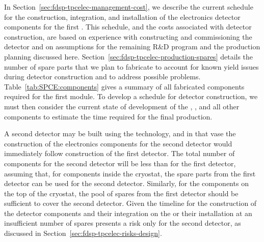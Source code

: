In Section~\ref{sec:fdsp-tpcelec-management-cost}, we describe
the current schedule for the construction, integration, and installation
of the  electronics detector components for the first  
. This schedule, and the costs associated
with detector construction, are based on experience with constructing
and commissioning the 
detector and on assumptions for the remaining R\&D program
and the production planning discussed here. 
Section~\ref{sec:fdsp-tpcelec-production-spares} details
the number of spare parts that we plan to fabricate to
account for known yield issues during detector construction
and to address possible problems. Table~\ref{tab:SPCE:components}
gives a summary of all fabricated components required for the first 
 module. To develop a schedule for detector construction, 
we must then consider the current state of development of 
the , , and all other components to 
estimate the time required for the final production.

A second detector may be built using the  technology, 
and in that vase the construction of the  electronics components 
for the second detector would immediately follow construction of 
the first detector. The total number of components for the second 
detector will be less than for the first detector, assuming that, 
for components inside the cryostat, the spare parts from the first 
detector can be used for the second detector. Similarly, for the 
components on the top of the cryostat, the pool of spares from the 
first detector should be sufficient to cover the second detector.
Given the timeline for the construction of the detector components
and their integration on the  or their installation at
 an insufficient number of spares presents a risk only
for the second detector, as discussed in Section~\ref{sec:fdsp-tpcelec-risks-design}.


